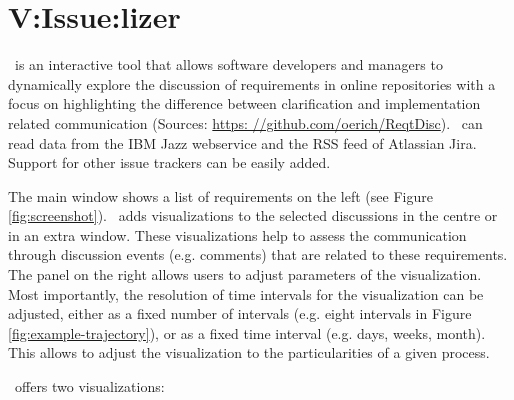 \section{V:Issue:lizer}

\viss\  is an interactive tool that allows software developers and managers to dynamically explore the discussion of requirements  in online repositories with a focus on highlighting the difference between clarification and implementation related communication (Sources: \url{https: //github.com/oerich/ReqtDisc}). %
\viss\ can read data from the IBM Jazz webservice and the RSS feed of Atlassian Jira.
Support for other issue trackers can be easily added.

The main window shows a list of requirements on the  left  (see Figure \ref{fig:screenshot}).
\viss\ adds visualizations to the selected discussions in the centre or in an extra window. 
These visualizations help to assess the communication through discussion events (e.g. comments) that are related to these requirements.
The panel on the right allows users to adjust parameters of the visualization.
Most importantly, the resolution of time intervals for the visualization can be adjusted, either as a fixed number of intervals (e.g. eight intervals in Figure \ref{fig:example-trajectory}), or as a fixed time interval (e.g. days, weeks, month).
This allows to adjust the visualization to the particularities of a given process.

\viss\  offers  two visualizations: 

